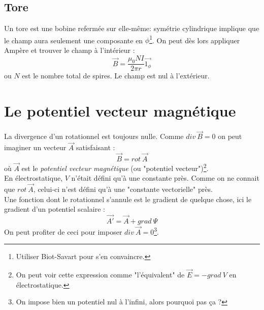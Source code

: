 \documentclass	[11pt, a4paper, openany]{book}
\begin{document}
\subsection{Tore}
Un tore est une bobine refermée sur elle-même: symétrie cylindrique implique que le champ aura seulement une composante en $\phi$\footnote{Utiliser Biot-Savart pour s'en convaincre.}. On peut dès lors appliquer Ampère et trouver le champ à l'intérieur :
\begin{equation}
\vec{B} = \frac{\mu_0 NI}{2\pi r}\vec{1_\phi}
\end{equation}
ou $N$ est le nombre total de spires. Le champ est nul à l'extérieur.

\section{Le potentiel vecteur magnétique}
La divergence d'un rotationnel est toujours nulle. Comme $div\ \vec{B} = 0$ on peut imaginer un vecteur $\vec A$ satisfaisant :
\begin{equation}
\vec{B} = rot\ \vec{A}
\end{equation}
où $\vec{A}$ est le \textit{potentiel vecteur magnétique} (ou "potentiel vecteur")\footnote{On peut voir cette expression comme "l'équivalent" de $\vec{E} = -grad\ V$ en électrostatique.}.\\

En électrostatique, $V$ n'était défini qu'à une constante près. Comme on ne connait que $rot\ \vec{A}$, celui-ci n'est défini qu'à une "constante vectorielle" près. \\
Une fonction dont le rotationnel s'annule est le gradient de quelque chose, ici le gradient d'un potentiel scalaire :
\begin{equation}
\vec{A'} = \vec{A} + grad\ \Psi
\end{equation}
On peut profiter de ceci pour  imposer $div\ \vec{A} = 0$\footnote{On impose bien un potentiel nul à l'infini, alors pourquoi pas ça ?}.\\
\end{document}
